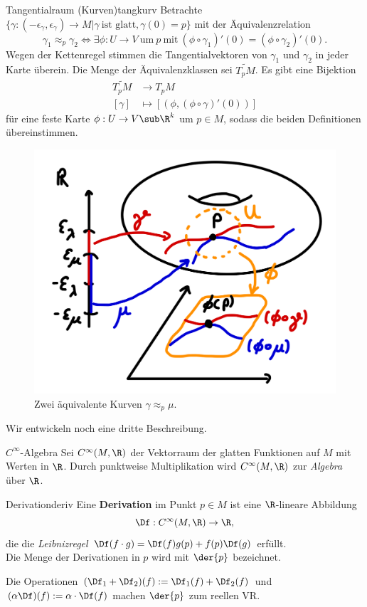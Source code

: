 \begin{definition}{Tangentialraum (Kurven)}{tangkurv}
Betrachte $\{ \gamma: (- \epsilon_\gamma, \epsilon_\gamma) \to M | \gamma \ \text{ist glatt}, \gamma(0)=p \}$ mit der Äquivalenzrelation
\begin{equation}
\gamma_1 \approx_p \gamma_2 \iff \exists \phi: U \to V \ \text{um} \ p \ \text{mit} \ (\phi \circ \gamma_1)'(0) = (\phi \circ \gamma_2)'(0).
\end{equation}
Wegen der Kettenregel stimmen die Tangentialvektoren von $\gamma_1$ und $\gamma_2$ in jeder Karte überein. Die Menge der Äquivalenzklassen sei $\widetilde{T_pM}$. Es gibt eine Bijektion
\begin{align}
\widetilde{T_pM} &\to T_pM \\
[\gamma] &\mapsto [(\phi, (\phi \circ \gamma)'(0))]
\end{align}
für eine feste Karte $\phi: U \to V \sub \R^k$ um $p \in M$, sodass die beiden Definitionen übereinstimmen.
\begin{figure}[H]
\label{fig:tangentialvek2}
\centering
\includegraphics[width=0.2\linewidth]{Bilder/tangentialvek2.png}
\caption{Zwei äquivalente Kurven $\gamma \approx_p \mu$.}
\end{figure}
\end{definition}
Wir entwickeln noch eine dritte Beschreibung.\\
\begin{lemma}{$C^\infty$-Algebra}{}
Sei $C^\infty(M, \R)$ der Vektorraum der glatten Funktionen auf $M$ mit Werten in $\R$. Durch punktweise Multiplikation wird $C^\infty(M, \R)$ zur \textit{Algebra} über $\R$.
\end{lemma}
\begin{definition}{Derivation}{deriv}
Eine \textbf{Derivation} im Punkt $p \in M$ ist eine $\R$-lineare Abbildung
\begin{equation}
\Df: C^\infty(M, \R) \to \R,
\end{equation}
die die \textit{Leibnizregel} $\Df (f \cdot g) = \Df (f) g(p) + f(p) \Df (g)$ erfüllt.\\
Die Menge der Derivationen in $p$ wird mit $\der{p}$ bezeichnet.
\end{definition}
Die Operationen $(\Df_1 + \Df_2)(f) := \Df_1 (f) + \Df_2 (f)$ und $(\alpha \Df)(f) := \alpha \cdot \Df(f)$ machen $\der{p}$ zum reellen VR.

